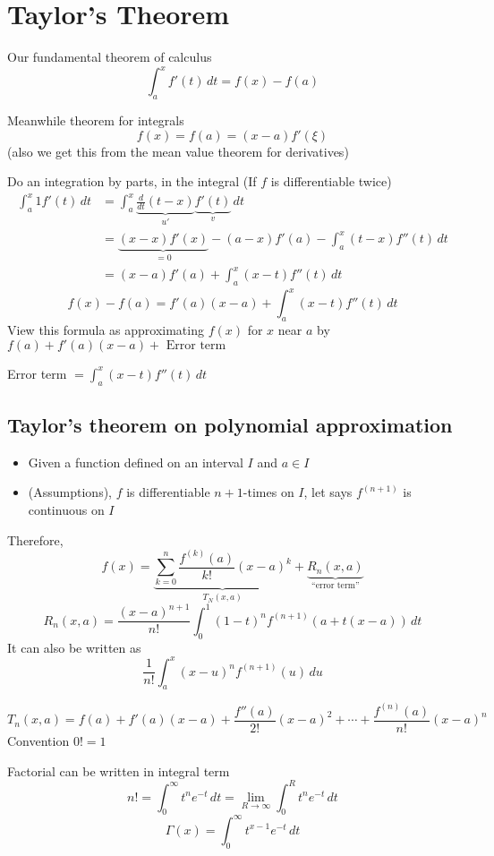 \chapter{Taylor's Theorem}

\begin{example*}
  Our fundamental theorem of calculus
  \[\int_a^x f'(t)\,dt = f(x) - f(a)\]

  Meanwhile theorem for integrals
  \[f(x) = f(a) = (x-a)f'(\xi)\]
  (also we get this from the mean value theorem for derivatives)

  Do an integration by parts, in the integral (If $f$ is differentiable twice)
  \begin{align*}
    \int_a^x 1 f'(t)\, dt &= \int_a^x \underbrace{\frac{d}{dt}(t-x)}_{u'}\underbrace{f'(t)}_v\, dt \\
    &= \underbrace{(x-x)f'(x)}_{=0} - (a-x)f'(a) - \int_a^x (t-x)f''(t)\, dt \\
    &= (x-a)f'(a) + \int_a^x (x-t)f''(t)\, dt
  \end{align*}
  \[f(x) - f(a) = f'(a)(x-a) + \int_a^x(x-t)f''(t)\, dt\]
  View this formula as approximating $f(x)$ for $x$ near $a$ by $f(a) + f'(a)(x-a) + \text{ Error term}$

  Error term $\displaystyle = \int_a^x (x-t) f''(t)\, dt$
\end{example*}

\section{Taylor's theorem on polynomial approximation}

\begin{itemize}
  \item Given a function defined on an interval $I$ and $a \in I$
  \item (Assumptions), $f$ is differentiable $n + 1$-times on $I$, let says $f^{(n+1)}$ is continuous on $I$
\end{itemize}
Therefore, 
\[f(x) = \underbrace{\sum_{k = 0}^{n} \frac{f^{(k)}(a)}{k!}(x-a)^k}_{T_N(x, a)} + \underbrace{R_n(x, a)}_{\text{``error term''}}\]
\[R_n(x, a) = \frac{(x-a)^{n+1}}{n!}\int_0^1(1-t)^nf^{(n+1)}(a + t(x-a))\, dt\]
It can also be written as 
\[\frac{1}{n!}\int_a^x (x-u)^nf^{(n+1)}(u)\, du\]

\[T_n(x, a) = f(a) + f'(a)(x-a) + \frac{f''(a)}{2!}(x-a)^2 + \cdots + \frac{f^{(n)}(a)}{n!}(x-a)^n\]
Convention $0! = 1$

Factorial can be written in integral term
\[n! = \int_0^\infty t^ne^{-t}\, dt = \lim\limits_{R\to\infty} \int_0^{R}t^ne^{-t}\, dt\]
\[\Gamma(x) = \int_0^\infty t^{x-1}e^{-t}\, dt\]

